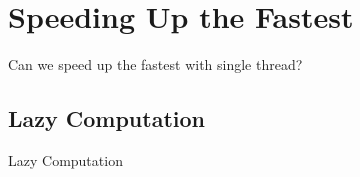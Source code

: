 \documentclass{beamer}
\begin{document}
\section{Speeding Up the Fastest}
\begin{frame}{Can we speed up the fastest with single thread?}
\begin{table}[ht]
	\center
	\caption{The length of longest merging sequence in PMF($h_{PMF}$) constructed in the first phase for random automata; maximum ($h_{max}$), and average ($h_{mean}$) lengths for merging sequences, used in the second phase of \textsc{Greedy}.}
\end{table}
\end{frame}

\subsection{Lazy Computation}
\begin{frame}{Lazy Computation}
\end{frame}
\end{document}
